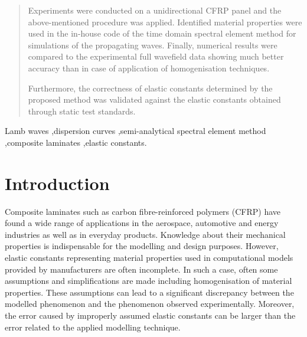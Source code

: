 \documentclass[preprint,12pt]{elsarticle}
\begin{document}
\begin{frontmatter}
\begin{abstract}
Experiments were conducted on a unidirectional CFRP panel and the above-mentioned procedure was applied. 
Identified material properties were used in the in-house code of the time domain spectral element method for simulations of the propagating waves. 
Finally, numerical results were compared to the experimental full wavefield data showing much better accuracy than in case of application of homogenisation techniques.

Furthermore, the correctness of elastic constants determined by the proposed method was validated against the elastic constants obtained through static test standards.
\end{abstract}

		\begin{keyword}
			Lamb waves \sep dispersion curves \sep semi-analytical spectral element method \sep composite laminates \sep elastic constants.


		\end{keyword}

	\end{frontmatter}


\section{Introduction}
Composite laminates such as carbon fibre-reinforced polymers (CFRP) have found a wide range of applications in the aerospace, automotive and energy industries as well as in everyday products. Knowledge about their mechanical properties is indispensable for the modelling and design purposes.
However, elastic constants representing material properties used in computational models provided by manufacturers are often incomplete. 
In such a case, often some assumptions and simplifications are made including homogenisation of material properties. 
These assumptions can lead to a significant discrepancy between the modelled phenomenon and the phenomenon observed experimentally.
Moreover, the error caused by improperly assumed elastic constants can be larger than the error related to the applied modelling technique.	
\end{document}
